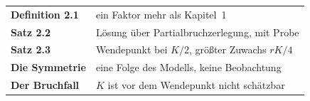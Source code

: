 \begin{merksatz}
\begin{center}
\renewcommand{\arraystretch}{1.5}
\begin{tabular}{@{}P{3.0cm}P{5.6cm}@{}}
\toprule
\textbf{Definition 2.1} & ein Faktor mehr als Kapitel~1\\
\textbf{Satz 2.2} & Lösung über Partialbruchzerlegung, mit Probe\\
\textbf{Satz 2.3} & Wendepunkt bei $K/2$, größter Zuwachs $rK/4$\\
\textbf{Die Symmetrie} & eine Folge des Modells, keine Beobachtung\\
\textbf{Der Bruchfall} & $K$ ist vor dem Wendepunkt nicht schätzbar\\
\bottomrule
\end{tabular}
\end{center}

\begin{center}
\begin{minipage}{0.88\textwidth}
\end{minipage}
\end{center}
\end{merksatz}
